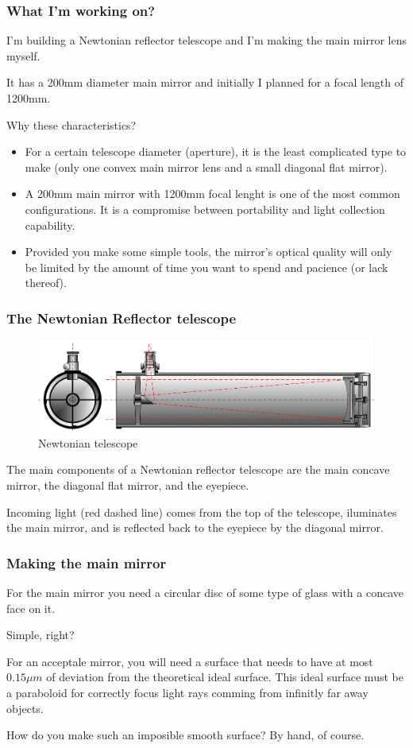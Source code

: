 \documentclass{beamer}
\begin{document}
\begin{frame}
\frametitle{What I'm working on?}
I'm building a Newtonian reflector telescope and I'm making the main mirror lens myself.

It has a 200mm diameter main mirror and initially I planned for a focal length of 1200mm.

Why these characteristics?
\begin{itemize}
\item For a certain telescope diameter (aperture), it is the least complicated type to make (only one convex main mirror lens and a small diagonal flat mirror).
\item A 200mm main mirror with 1200mm focal lenght is one of the most common configurations. It is a compromise between portability and light collection capability.
\item Provided you make some simple tools, the mirror's optical quality will only be limited by the amount of time you want to spend and pacience (or lack thereof).
\end{itemize}
\end{frame}

\begin{frame}
\frametitle{The Newtonian Reflector telescope}
\begin{figure}
\includegraphics[scale=0.4]{assets/Newtontelescope.png}
\caption{Newtonian telescope}
\end{figure}
The main components of a Newtonian reflector telescope are the main concave mirror\footnotemark,
the diagonal flat mirror, and the eyepiece\footnotemark.

Incoming light (red dashed line) comes from the top of the telescope, iluminates the main mirror, and is reflected back to the eyepiece by the diagonal mirror.
\end{frame}

\begin{frame}
\frametitle{Making the main mirror}
For the main mirror you need a circular disc of some type of glass with a concave face on it.

Simple, right?

For an acceptale mirror, you will need a surface that needs to have at most $0.15 \mu m$ of deviation from the theoretical ideal surface. This ideal surface must be a paraboloid for correctly focus light rays comming from infinitly far away objects.

How do you make such an imposible smooth surface? By hand, of course.

\end{frame}
\end{document}
